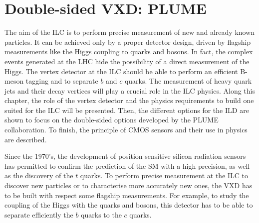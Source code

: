 \chapter{Double-sided VXD: PLUME}
\label{chap:vxd}


  The aim of the \gls{ILC} is to perform precise measurement of new and already known particles. 
  It can be achieved only by a proper detector design, driven by flagship measurements like the Higgs coupling to quarks and bosons.
  In fact, the complex events generated at the \gls{LHC} hide the possibility of a direct measurement of the Higgs.
  The vertex detector at the \gls{ILC} should be able to perform an efficient B-meson tagging and to separate $b$ and $c$ quarks.
  The measurement of heavy quark jets and their decay vertices will play a crucial role in the \gls{ILC} physics.
  Along this chapter, the role of the vertex detector and the physics requirements to build one suited for the \gls{ILC} will be presented.
  Then, the different options for the \gls{ILD} are shown to focus on the double-sided options developed by the PLUME collaboration.
  To finish, the principle of \gls{CMOS} sensors and their use in physics are described.

  Since the 1970's, the development of position sensitive silicon radiation sensors has permitted to confirm the prediction of the \gls{SM} with a high precision, as well as the discovery of the $t$ quarks.
  To perform precise measurement at the \gls{ILC} to discover new particles or to characterise more accurately new ones, the \gls{VXD} has to be built with respect some flagship measurements.
  For example, to study the coupling of the Higgs with the quarks and bosons, this detector has to be able to separate efficiently the $b$ quarks to the $c$ quarks.

